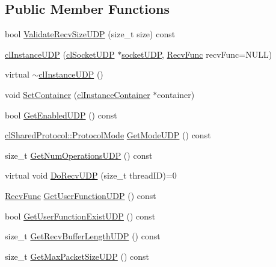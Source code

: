 \subsection*{Public Member Functions}
\begin{DoxyCompactItemize}
\item 
bool \hyperlink{classcl_instance_u_d_p_aabeda7b42ed30e4c143bc726fdbba290}{ValidateRecvSizeUDP} (size\_\-t size) const 
\item 
\hyperlink{classcl_instance_u_d_p_acada026824ef6cb703fa90055baced48}{clInstanceUDP} (\hyperlink{classcl_socket_u_d_p}{clSocketUDP} $\ast$\hyperlink{classcl_instance_u_d_p_adabf31cb357eb5dada6ad5c8e57c611e}{socketUDP}, \hyperlink{classcl_instance_core_afa96c2a2c0b26b6a9256b87798bf9587}{RecvFunc} recvFunc=NULL)
\item 
virtual \hyperlink{classcl_instance_u_d_p_a7b8d9067ea0d2835275f1365f2a52c8c}{$\sim$clInstanceUDP} ()
\item 
void \hyperlink{classcl_instance_u_d_p_a2b1ca50c2b076e37fecbff3269083c67}{SetContainer} (\hyperlink{classcl_instance_container}{clInstanceContainer} $\ast$container)
\item 
bool \hyperlink{classcl_instance_u_d_p_aab18f3fec8c8dd3c77cccb764a733a85}{GetEnabledUDP} () const 
\item 
\hyperlink{classcl_shared_protocol_a4b0b9c82b8ae4eee78c6308c35afd47b}{clSharedProtocol::ProtocolMode} \hyperlink{classcl_instance_u_d_p_a4bc570a7c6a32732c6aa22cae4b97200}{GetModeUDP} () const 
\item 
size\_\-t \hyperlink{classcl_instance_u_d_p_a8fa59e6d4095cc3b08c3a9686e84bf08}{GetNumOperationsUDP} () const 
\item 
virtual void \hyperlink{classcl_instance_u_d_p_ac481cdb9cb825fd303acf8a16da332a2}{DoRecvUDP} (size\_\-t threadID)=0
\item 
\hyperlink{classcl_instance_core_afa96c2a2c0b26b6a9256b87798bf9587}{RecvFunc} \hyperlink{classcl_instance_u_d_p_a6c572f9022c5e8f7009a5f88429559fe}{GetUserFunctionUDP} () const 
\item 
bool \hyperlink{classcl_instance_u_d_p_a2a652c327503bf9aa27ae528027051c5}{GetUserFunctionExistUDP} () const 
\item 
size\_\-t \hyperlink{classcl_instance_u_d_p_a1013b00e96bd8f21d21bc14e3c146f74}{GetRecvBufferLengthUDP} () const 
\item 
size\_\-t \hyperlink{classcl_instance_u_d_p_af66c8b259f6aae9603bac614f07bb368}{GetMaxPacketSizeUDP} () const 
\item 

\end{DoxyCompactItemize}
